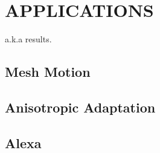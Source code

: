 
\chapter{APPLICATIONS}

a.k.a results.

\section{Mesh Motion}

\section{Anisotropic Adaptation}

\section{Alexa}




